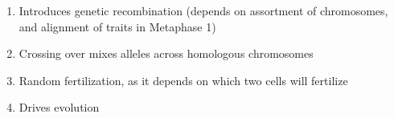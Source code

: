 \documentclass[12pt]{article}
\begin{document}
\begin{itemize}
\begin{enumerate}
    \item Introduces genetic recombination (depends on assortment of chromosomes, and alignment of traits in Metaphase 1)

    \item Crossing over mixes alleles across homologous chromosomes

    \item Random fertilization, as it depends on which two cells will fertilize

    \item Drives evolution

  \end{enumerate}

\end{itemize}
\end{document}
